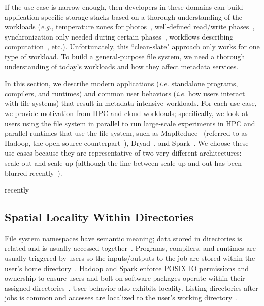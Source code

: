 If the use case is narrow enough, then developers in these domains can build
application-specific storage stacks based on a thorough understanding of the
workloads ({\it e.g.}, temperature zones for
photos~\cite{muralidhar:osdi2014-f4}, well-defined read/write
phases~\cite{dean:osdi2004-mapreduce, dean_evolution_2010}, synchronization
only needed during certain phases~\cite{hakimzadeh:dais14-hdfs-consistency,
zheng:pdsw2015-deltafs}, workflows describing computation~\cite{yoo_slurm_2003,
gamblin_spack_2015}, etc.). Unfortunately, this ``clean-slate" approach only
works for one type of workload. To build a general-purpose file system, we need
a thorough understanding of today's workloads and how they affect metadata
services.  

In this section, we describe modern applications ({\it i.e.} standalone
programs, compilers, and runtimes) and common user behaviors ({\it i.e.} how
users interact with file systems) that result in metadata-intensive workloads.
For each use case, we provide motivation from HPC and cloud workloads;
specifically, we look at users using the file system in parallel to run
large-scale experiments in HPC and parallel runtimes that use the file system,
such as MapReduce~\cite{dean:osdi2004-mapreduce} (referred to as Hadoop, the
open-source counterpart~\cite{shvachko_hadoop_2010}),
Dryad~\cite{isard:EuroSys2007-dryad}, and Spark~\cite{zaharia:nsdi2012-spark}.
We choose these use cases because they are representative of two very different
architectures:  scale-out and scale-up (although the line between scale-up and
out has been blurred recently~\cite{gigaspaces:whitepaper2011-su-vs-so,
michael:2007pdps-scale-up-x-scale-out,
rowstron:hotcdp2012-hadoop-vs-single-node, sevilla:discs2013-framework
sevilla:lspp2014-supmr}).

recently
\subsection{Spatial Locality Within Directories}
\label{sec:spatial-locality-within-directories}

File system namespaces have semantic meaning; data stored in directories is
related and is usually accessed together~\cite{weil:osdi2006-ceph,
weil:sc2004-dyn-metadata}. Programs, compilers, and runtimes are usually
triggered by users so the inputs/outputs to the job are stored within the
user's home directory~\cite{weil:phdthesis07}. Hadoop and Spark enforce POSIX
IO permissions and ownership to ensure users and bolt-on software packages
operate within their assigned directories~\cite{docs:hadoopperm}.  User
behavior also exhibits locality. Listing directories after jobs is common and
accesses are localized to the user's working
directory~\cite{roselli:atec2000-FS-workloads, abad:ucc2012-mimesis}.

